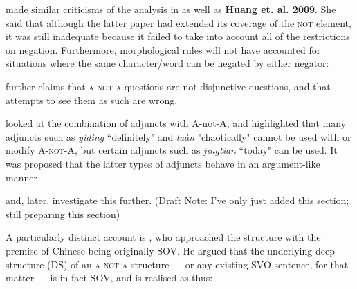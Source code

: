 \documentclass[12pt, UTF8]{article}
\begin{document}
\cite{Liing2014} made similar criticisms of the analysis in \cite{Huang1991} as well as \textbf{Huang et. al. 2009}. She said that although the latter paper had extended its coverage of the \textsc{not} element, it was still inadequate because it failed to take into account all of the restrictions on negation. Furthermore, morphological rules will not have accounted for situations where the same character/word can be negated by either negator:

\begin{exe}



\end{exe}

\cite{Liing2014} further claims that \textsc{a-not-a} questions are not disjunctive questions, and that attempts to see them as such are wrong. 


\cite{Ernst1994} looked at the combination of adjuncts with A-not-A, and highlighted that many adjuncts such as \textit{y\'{i}d\`{i}ng} ``definitely" and \textit{lu\`{a}n} "chaotically" cannot be used with or modify \textsc{A-not-A}, but certain adjuncts such as \textit{j\={\i}ngti\={a}n} ``today" can be used. It was proposed that the latter types of adjuncts behave in an argument-like manner


\cite{Law2001} and, later,
\cite{Law2006} investigate this further. (Draft Note: I've only just added this section; still preparing this section)

A particularly distinct account is \cite{Gasde2001}, who approached the structure with the premise of Chinese being originally SOV. He argued that the underlying deep structure (DS) of an \textsc{a-not-a} structure --- or any existing SVO sentence, for that matter --- is in fact SOV, and is realised as thus:
\end{document}
